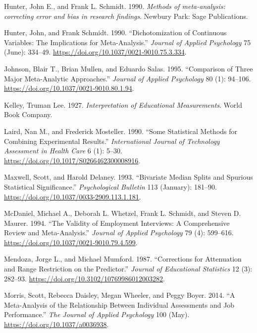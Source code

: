 \documentclass[
  letterpaper,
  DIV=11,
  numbers=noendperiod]{scrreprt}
\newlength{\cslhangindent}
\newlength{\cslentryspacingunit} %
\newenvironment{CSLReferences}[2] %
 {%
  \setlength{\parindent}{0pt}
  \ifodd #1
  \let\oldpar\par
  \def\par{\hangindent=\cslhangindent\oldpar}
  \fi
  \setlength{\parskip}{#2\cslentryspacingunit}
 }%
 {}
\begin{document}
\begin{CSLReferences}{1}{0}
\leavevmode{}%
Hunter, John E., and Frank L. Schmidt. 1990. \emph{Methods of
meta-analysis: correcting error and bias in research findings}. Newbury
Park: Sage Publications.

\leavevmode{}%
Hunter, John, and Frank Schmidt. 1990. {``Dichotomization of Continuous
Variables: The Implications for Meta-Analysis.''} \emph{Journal of
Applied Psychology} 75 (June): 334--49.
\url{https://doi.org/10.1037/0021-9010.75.3.334}.

\leavevmode{}%
Johnson, Blair T., Brian Mullen, and Eduardo Salas. 1995. {``Comparison
of Three Major Meta-Analytic Approaches.''} \emph{Journal of Applied
Psychology} 80 (1): 94--106.
\url{https://doi.org/10.1037/0021-9010.80.1.94}.

\leavevmode{}%
Kelley, Truman Lee. 1927. \emph{Interpretation of Educational
Measurements}. World Book Company.

\leavevmode{}%
Laird, Nan M., and Frederick Mosteller. 1990. {``Some Statistical
Methods for Combining Experimental Results.''} \emph{International
Journal of Technology Assessment in Health Care} 6 (1): 5--30.
\url{https://doi.org/10.1017/S0266462300008916}.

\leavevmode{}%
Maxwell, Scott, and Harold Delaney. 1993. {``Bivariate Median Splits and
Spurious Statistical Significance.''} \emph{Psychological Bulletin} 113
(January): 181--90. \url{https://doi.org/10.1037/0033-2909.113.1.181}.

\leavevmode{}%
McDaniel, Michael A., Deborah L. Whetzel, Frank L. Schmidt, and Steven
D. Maurer. 1994. {``The Validity of Employment Interviews: A
Comprehensive Review and Meta-Analysis.''} \emph{Journal of Applied
Psychology} 79 (4): 599--616.
\url{https://doi.org/10.1037/0021-9010.79.4.599}.

\leavevmode{}%
Mendoza, Jorge L., and Michael Mumford. 1987. {``Corrections for
Attenuation and Range Restriction on the Predictor.''} \emph{Journal of
Educational Statistics} 12 (3): 282--93.
\url{https://doi.org/10.3102/10769986012003282}.

\leavevmode{}%
Morris, Scott, Rebecca Daisley, Megan Wheeler, and Peggy Boyer. 2014.
{``A Meta-Analysis of the Relationship Between Individual Assessments
and Job Performance.''} \emph{The Journal of Applied Psychology} 100
(May). \url{https://doi.org/10.1037/a0036938}.


\end{CSLReferences}
\end{document}
